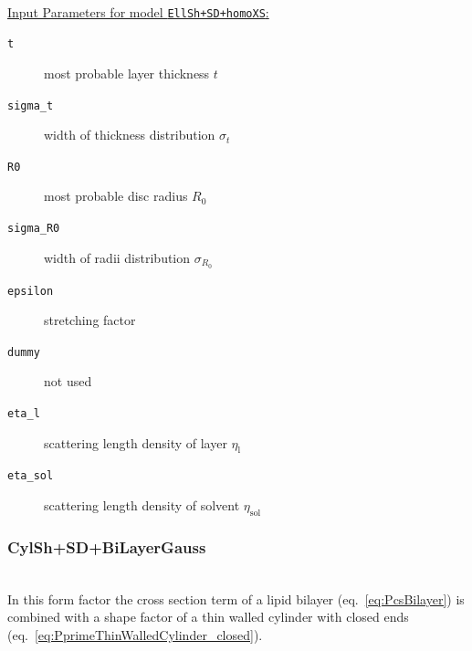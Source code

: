\hspace{1pt}\\
\uline{Input Parameters for model \texttt{EllSh+SD+homoXS}:}\\
\begin{description}
\item[\texttt{t}] most probable layer thickness $t$
\item[\texttt{sigma\_t}] width of thickness distribution $\sigma_t$
\item[\texttt{R0}] most probable disc radius $R_0$
\item[\texttt{sigma\_R0}] width of radii distribution $\sigma_{R_0}$
\item[\texttt{epsilon}] stretching factor
\item[\texttt{dummy}] not used
\item[\texttt{eta\_l}] scattering length density of layer $\eta_\mathrm{l}$
\item[\texttt{eta\_sol}] scattering length density of solvent $\eta_\mathrm{sol}$
\end{description}


\vspace{5mm}

\noindent
\subsubsection{CylSh+SD+BiLayerGauss} ~\\

\noindent
In this form factor the cross section term of a lipid bilayer (eq.\ \ref{eq:PcsBilayer}) is combined with a shape factor of a thin walled cylinder with closed ends (eq.\ \ref{eq:PprimeThinWalledCylinder_closed}).

\vspace{5mm}

